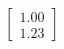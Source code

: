 \documentclass[preview]{standalone}
\begin{document}
\begin{align*}
\begin{bmatrix} 1.00 \\ 1.23 \end{bmatrix}
\end{align*}
\end{document}
